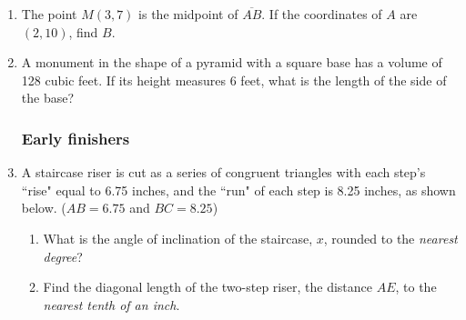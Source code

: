 \documentclass[12pt, twoside]{article}
\begin{document}
\begin{enumerate}
  \item The point $M(3,7)$ is the midpoint of $\overline{AB}$. If the coordinates of $A$ are $(2,10)$, find $B$. \vspace{2.5cm}

  \item A monument in the shape of a pyramid with a square base has a volume of 128 cubic feet. If its height measures 6 feet, what is the length of the side of the base? \vspace{3.5cm}

\newpage
\subsubsection*{Early finishers}

  \item A staircase riser is cut as a series of congruent triangles with each step's ``rise" equal to 6.75 inches, and the ``run" of each step is 8.25 inches, as shown below. ($AB=6.75$ and $BC=8.25$)
  \begin{enumerate}
    \item What is the angle of inclination of the staircase, $x$, rounded to the \emph{nearest degree}?\\[0.5cm] 
      \item Find the diagonal length of the two-step riser, the distance $AE$, to the \emph{nearest tenth of an inch}.
    \end{enumerate} \vspace{2.5cm}


\end{enumerate}
\end{document}
